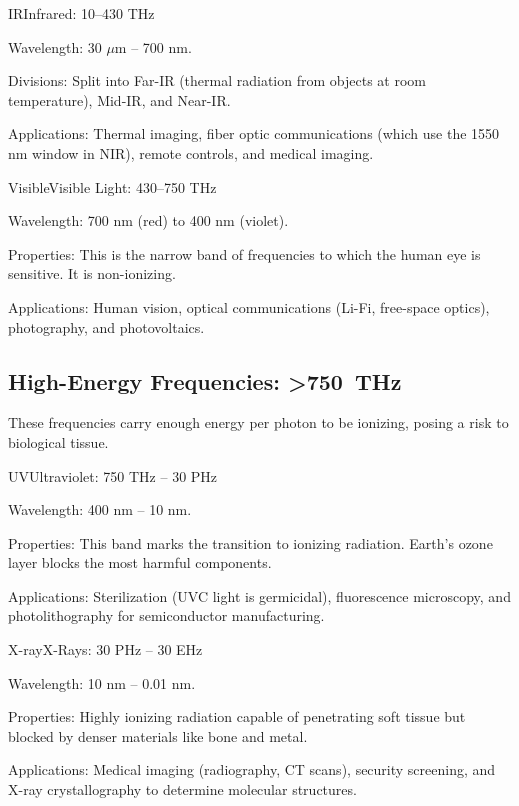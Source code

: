 \begin{spectrumband}{IR}{Infrared: 10--430 THz}
    \item[Wavelength:] 30 $\mu$m -- 700 nm.
    \item[Divisions:] Split into Far-IR (thermal radiation from objects at room temperature), Mid-IR, and Near-IR.
    \item[Applications:] Thermal imaging, fiber optic communications (which use the 1550 nm window in NIR), remote controls, and medical imaging.
\end{spectrumband}

\begin{spectrumband}{Visible}{Visible Light: 430--750 THz}
    \item[Wavelength:] 700 nm (red) to 400 nm (violet).
    \item[Properties:] This is the narrow band of frequencies to which the human eye is sensitive. It is non-ionizing.
    \item[Applications:] Human vision, optical communications (Li-Fi, free-space optics), photography, and photovoltaics.
\end{spectrumband}

\subsection{High-Energy Frequencies: >\qty{750}{THz}}

These frequencies carry enough energy per photon to be ionizing, posing a risk to biological tissue.

\begin{spectrumband}{UV}{Ultraviolet: 750 THz -- 30 PHz}
    \item[Wavelength:] 400 nm -- 10 nm.
    \item[Properties:] This band marks the transition to ionizing radiation. Earth's ozone layer blocks the most harmful components.
    \item[Applications:] Sterilization (UVC light is germicidal), fluorescence microscopy, and photolithography for semiconductor manufacturing.
\end{spectrumband}

\begin{spectrumband}{X-ray}{X-Rays: 30 PHz -- 30 EHz}
    \item[Wavelength:] 10 nm -- 0.01 nm.
    \item[Properties:] Highly ionizing radiation capable of penetrating soft tissue but blocked by denser materials like bone and metal.
    \item[Applications:] Medical imaging (radiography, CT scans), security screening, and X-ray crystallography to determine molecular structures.
\end{spectrumband}

